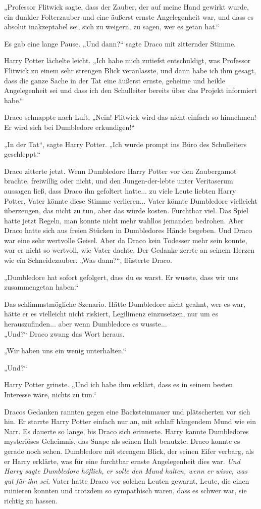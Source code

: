 {„Professor Flitwick sagte, dass der Zauber, der auf meine Hand gewirkt wurde, ein dunkler Folterzauber und eine äußerst ernste Angelegenheit war, und dass es absolut inakzeptabel sei, sich zu weigern, zu sagen, wer es getan hat.“

Es gab eine lange Pause. „Und dann?“ sagte Draco mit zitternder Stimme.

Harry Potter lächelte leicht. „Ich habe mich zutiefst entschuldigt, was Professor Flitwick zu einem sehr strengen Blick veranlasste, und dann habe ich ihm gesagt, dass die ganze Sache in der Tat eine äußerst ernste, geheime und heikle Angelegenheit sei und dass ich den Schulleiter bereits über das Projekt informiert habe.“

Draco schnappte nach Luft. „Nein! Flitwick wird das nicht einfach so hinnehmen! Er wird sich bei Dumbledore erkundigen!“

„In der Tat“, sagte Harry Potter. „Ich wurde prompt ins Büro des Schulleiters geschleppt.“

Draco zitterte jetzt. Wenn Dumbledore Harry Potter vor den Zaubergamot brachte, freiwillig oder nicht, und den Jungen-der-lebte unter Veritaserum aussagen ließ, dass Draco ihn gefoltert hatte... zu viele Leute liebten Harry Potter, Vater könnte diese Stimme verlieren... Vater könnte Dumbledore vielleicht überzeugen, das nicht zu tun, aber das würde kosten. Furchtbar viel. Das Spiel hatte jetzt Regeln, man konnte nicht mehr wahllos jemanden bedrohen. Aber Draco hatte sich aus freien Stücken in Dumbledores Hände begeben. Und Draco war eine sehr wertvolle Geisel. Aber da Draco kein Todesser mehr sein konnte, war er nicht so wertvoll, wie Vater dachte. Der Gedanke zerrte an seinem Herzen wie ein Schneidezauber. „Was dann?“, flüsterte Draco.

„Dumbledore hat sofort gefolgert, dass du es warst. Er wusste, dass wir uns zusammengetan haben.“

Das schlimmstmögliche Szenario. Hätte Dumbledore nicht geahnt, wer es war, hätte er es vielleicht nicht riskiert, Legilimenz einzusetzen, nur um es herauszufinden... aber wenn Dumbledore es wusste...\\ „Und?“ Draco zwang das Wort heraus.

„Wir haben uns ein wenig unterhalten.“

„Und?“

Harry Potter grinste. „Und ich habe ihm erklärt, dass es in seinem besten Interesse wäre, nichts zu tun.“

Dracos Gedanken rannten gegen eine Backsteinmauer und plätscherten vor sich hin. Er starrte Harry Potter einfach nur an, mit schlaff hängendem Mund wie ein Narr. Es dauerte so lange, bis Draco sich erinnerte. Harry kannte Dumbledores mysteriöses Geheimnis, das Snape als seinen Halt benutzte. Draco konnte es gerade noch sehen. Dumbledore mit strengem Blick, der seinen Eifer verbarg, als er Harry erklärte, was für eine furchtbar ernste Angelegenheit dies war. \emph{Und Harry sagte Dumbledore höflich, er solle den Mund halten, wenn er wisse, was gut für ihn sei}. Vater hatte Draco vor solchen Leuten gewarnt, Leute, die einen ruinieren konnten und trotzdem so sympathisch waren, dass es schwer war, sie richtig zu hassen.

}

